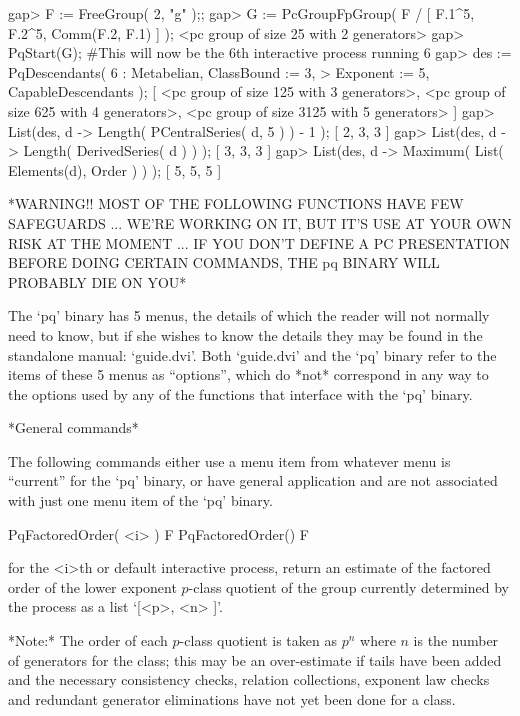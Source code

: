\beginexample
gap> F := FreeGroup( 2, "g" );;
gap> G := PcGroupFpGroup( F / [ F.1^5, F.2^5, Comm(F.2, F.1) ] );
<pc group of size 25 with 2 generators>
gap> PqStart(G); #This will now be the 6th interactive process running
6
gap> des := PqDescendants( 6 : Metabelian, ClassBound := 3,
>                              Exponent := 5, CapableDescendants );
[ <pc group of size 125 with 3 generators>, 
  <pc group of size 625 with 4 generators>, 
  <pc group of size 3125 with 5 generators> ]
gap> List(des, d -> Length( PCentralSeries( d, 5 ) ) - 1 );
[ 2, 3, 3 ]
gap> List(des, d -> Length( DerivedSeries( d ) ) );
[ 3, 3, 3 ]
gap> List(des, d -> Maximum( List( Elements(d), Order ) ) );
[ 5, 5, 5 ]
\endexample


*WARNING!! MOST OF THE FOLLOWING FUNCTIONS HAVE FEW SAFEGUARDS ... WE'RE
 WORKING ON IT, BUT IT'S USE AT YOUR OWN RISK AT THE MOMENT ... IF YOU
 DON'T DEFINE A PC PRESENTATION BEFORE DOING CERTAIN COMMANDS, THE pq
 BINARY WILL PROBABLY DIE ON YOU*

The `pq' binary has 5 menus, the details of which  the  reader  will  not
normally need to know, but if she wishes to know the details they may  be
found in the standalone manual: `guide.dvi'.  Both  `guide.dvi'  and  the
`pq' binary refer to the items of these 5 menus as ``options'', which  do
*not* correspond in any way to the options used  by  any  of  the  {\GAP}
functions that interface with the `pq' binary.

*General commands*

The following commands either use a  menu  item  from  whatever  menu  is
``current'' for the `pq' binary, or have general application and are  not
associated with just one menu item of the `pq' binary.

\>PqFactoredOrder( <i> ) F
\>PqFactoredOrder() F

for the <i>th or default interactive {\ANUPQ} process, return an estimate
of the factored order of the lower exponent  $p$-class  quotient  of  the
group currently determined by the process as a list `[<p>, <n> ]'.

*Note:* The order of each $p$-class quotient is taken as $p^n$ where  $n$
is the number of generators for the class; this may be  an  over-estimate
if tails have been added and the necessary consistency  checks,  relation
collections, exponent law checks  and  redundant  generator  eliminations
have not yet been done for a class.

